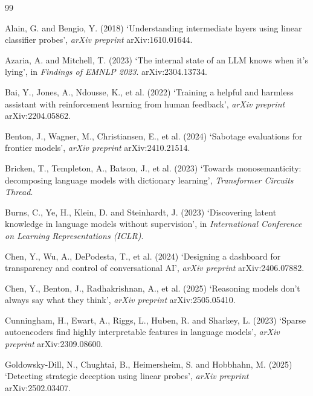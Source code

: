 \documentclass[conference]{IEEEtran}
\begin{document}
\begin{thebibliography}{99}
\setlength{\itemsep}{2pt}

Alain, G. and Bengio, Y. (2018) `Understanding intermediate layers using linear
classifier probes', \textit{arXiv preprint} arXiv:1610.01644.

Azaria, A. and Mitchell, T. (2023) `The internal state of an LLM knows when it's
lying', in \textit{Findings of EMNLP 2023}. arXiv:2304.13734.

Bai, Y., Jones, A., Ndousse, K., et al. (2022) `Training a helpful and harmless
assistant with reinforcement learning from human feedback', \textit{arXiv
preprint} arXiv:2204.05862.

Benton, J., Wagner, M., Christiansen, E., et al. (2024) `Sabotage evaluations
for frontier models', \textit{arXiv preprint} arXiv:2410.21514.

Bricken, T., Templeton, A., Batson, J., et al. (2023) `Towards monosemanticity:
decomposing language models with dictionary learning',
\textit{Transformer Circuits Thread}.

Burns, C., Ye, H., Klein, D. and Steinhardt, J. (2023) `Discovering latent
knowledge in language models without supervision', in \textit{International
Conference on Learning Representations (ICLR)}.

Chen, Y., Wu, A., DePodesta, T., et al. (2024) `Designing a dashboard for
transparency and control of conversational AI', \textit{arXiv preprint}
arXiv:2406.07882.

Chen, Y., Benton, J., Radhakrishnan, A., et al. (2025) `Reasoning models
don't always say what they think', \textit{arXiv preprint}
arXiv:2505.05410.

Cunningham, H., Ewart, A., Riggs, L., Huben, R. and Sharkey, L. (2023) `Sparse
autoencoders find highly interpretable features in language models',
\textit{arXiv preprint} arXiv:2309.08600.

Goldowsky-Dill, N., Chughtai, B., Heimersheim, S. and Hobbhahn, M. (2025)
`Detecting strategic deception using linear probes', \textit{arXiv preprint}
arXiv:2502.03407.


\end{thebibliography}
\end{document}
